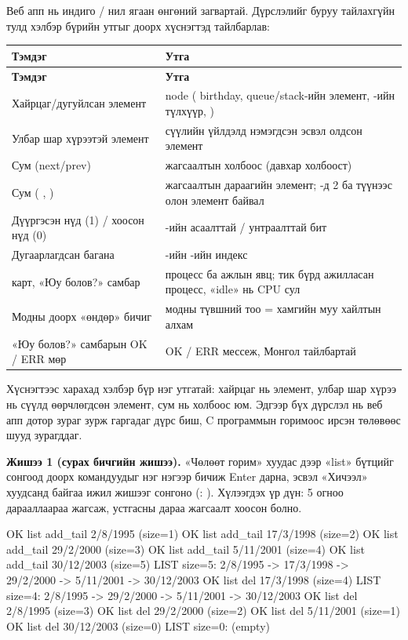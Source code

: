 Веб апп нь индиго / нил ягаан өнгөний загвартай. Дүрслэлийг буруу тайлахгүйн тулд хэлбэр бүрийн утгыг доорх хүснэгтэд тайлбарлав:
\begin{longtable}{@{}L{62mm}L{96mm}@{}}
\textbf{Тэмдэг} & \textbf{Утга}\\
\endfirsthead
\textbf{Тэмдэг} & \textbf{Утга}\\
\endhead
Хайрцаг/дугуйлсан элемент & node ( birthday, queue/stack-ийн элемент, -ийн түлхүүр, )\\
Улбар шар хүрээтэй элемент & сүүлийн үйлдэлд нэмэгдсэн эсвэл олдсон элемент\\
Сум (next/prev) & жагсаалтын холбоос (давхар холбоост)\\
Сум ( , ) & жагсаалтын дараагийн элемент; -д 2 ба түүнээс олон элемент байвал \\
Дүүргэсэн нүд (1) / хоосон нүд (0) & -ийн асаалттай / унтраалттай бит\\
Дугаарлагдсан багана & -ийн -ийн индекс\\
 карт, «Юу болов?» самбар & процесс ба ажлын явц; тик бүрд ажилласан процесс, «idle» нь CPU сул\\
Модны доорх «өндөр» бичиг & модны түвшний тоо = хамгийн муу хайлтын алхам\\
«Юу болов?» самбарын OK / ERR мөр & OK / ERR мессеж, Монгол тайлбартай\\
\end{longtable}
Хүснэгтээс харахад хэлбэр бүр нэг утгатай: хайрцаг нь элемент, улбар шар хүрээ нь сүүлд өөрчлөгдсөн элемент, сум нь холбоос юм. Эдгээр бүх дүрслэл нь веб апп дотор зураг зурж гаргадаг дүрс биш, C программын  горимоос ирсэн төлөвөөс шууд зурагддаг.

\textbf{Жишээ 1 (сурах бичгийн жишээ).} «Чөлөөт горим» хуудас дээр «list» бүтцийг сонгоод доорх командуудыг нэг нэгээр бичиж Enter дарна, эсвэл «Хичээл» хуудсанд байгаа ижил жишээг сонгоно (: ). Хүлээгдэх үр дүн: 5 огноо дарааллаараа жагсаж, устгасны дараа жагсаалт хоосон болно.
\begin{codeblock}
OK list add_tail 2/8/1995 (size=1)
OK list add_tail 17/3/1998 (size=2)
OK list add_tail 29/2/2000 (size=3)
OK list add_tail 5/11/2001 (size=4)
OK list add_tail 30/12/2003 (size=5)
LIST size=5: 2/8/1995 -> 17/3/1998 -> 29/2/2000 -> 5/11/2001 -> 30/12/2003
OK list del 17/3/1998 (size=4)
LIST size=4: 2/8/1995 -> 29/2/2000 -> 5/11/2001 -> 30/12/2003
OK list del 2/8/1995 (size=3)
OK list del 29/2/2000 (size=2)
OK list del 5/11/2001 (size=1)
OK list del 30/12/2003 (size=0)
LIST size=0: (empty)
\end{codeblock}

